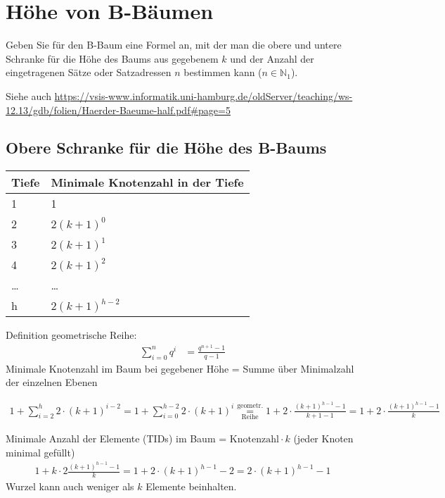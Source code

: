 \section{Höhe von B-Bäumen}
Geben Sie für den B-Baum eine Formel an, mit der man die obere und untere Schranke für die Höhe des Baums aus gegebenem $k$ und der Anzahl der eingetragenen Sätze oder Satzadressen $n$ bestimmen kann ($n\in\mathbb{N}_1$).

\begin{note}
	Siehe auch \url{https://vsis-www.informatik.uni-hamburg.de/oldServer/teaching/ws-12.13/gdb/folien/Haerder-Baeume-half.pdf\#page=5}
\end{note}

\begin{solution}

\subsection*{Obere Schranke für die Höhe des B-Baums}
\begin{tabular}{p{2cm} p{8cm}}
	Tiefe			& Minimale Knotenzahl in der Tiefe		\\
	\hline
	1				& 1 														\\
	\hline
	2 				& $2(k+1)^0$ 										\\
	\hline
	3 				& $2(k+1)^1$  									\\
	\hline
	4 				& $2(k+1)^2$ 										\\
	\hline
	\ldots 		& \ldots												\\
	\hline
	h 				& $2(k+1)^{h-2}$ 								\\
	\hline
\end{tabular}

Definition geometrische Reihe:
\begin{align*}
\sum_{i=0}^n q^i &= \frac{q^{n+1}-1}{q-1}
\end{align*}
Minimale Knotenzahl im Baum bei gegebener Höhe =
Summe über Minimalzahl der einzelnen Ebenen

\begin{align*}
1 + \sum_{i = 2}^h 2\cdot (k + 1)^{i-2} = 1 + \sum_{i  = 0}^{h-2} 2 \cdot (k +1)^{i}
\overset{\text{geometr.}}{\underset{\text{Reihe}}{=}} 1 + 2 \cdot \frac{(k +1)^{h-1} - 1}{k + 1 - 1}
= 1 + 2 \cdot \frac{(k + 1)^{h - 1} - 1}{k}
\end{align*}

Minimale Anzahl der Elemente (TIDs) im Baum =
$\mathrm{Knotenzahl} \cdot k$ (jeder Knoten minimal gefüllt)
\begin{align*}
1 + k \cdot 2 \frac{(k + 1)^{h - 1} - 1}{k} = 1 + 2 \cdot (k + 1)^{h - 1} - 2 = 2 \cdot (k + 1)^{h - 1} - 1
\end{align*}
Wurzel kann auch weniger als $k$ Elemente beinhalten.


\end{solution}
